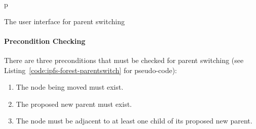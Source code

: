 \begin{stusubfig}{p}
	\hspace{8mm}%
	\\
	\hspace{8mm}%
\caption{The user interface for parent switching}
\label{fig:ipfs-forest-parentswitch-gui}
\end{stusubfig}

\paragraph{Precondition Checking}

There are three preconditions that must be checked for parent switching (see Listing~\ref{code:ipfs-forest-parentswitch} for pseudo-code):

\begin{enumerate}

\item The node being moved must exist.
\item The proposed new parent must exist.
\item The node must be adjacent to at least one child of its proposed new parent.

\end{enumerate}

